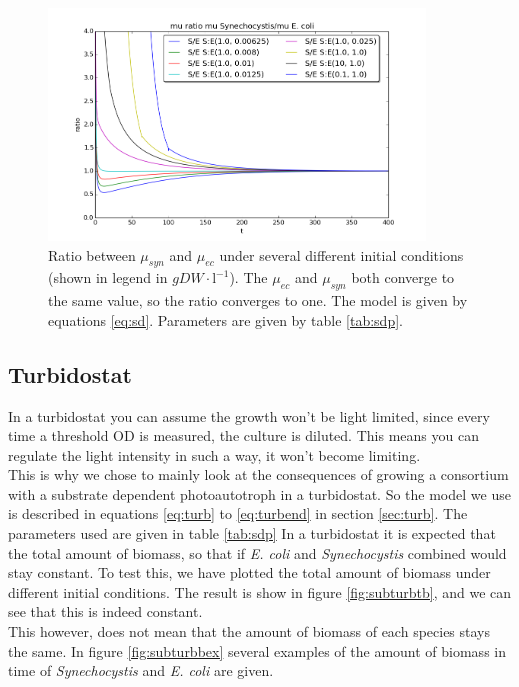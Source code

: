 \documentclass[10pt]{report}
\begin{document}
\begin{figure}[!ht]
 \begin{center}  
     \includegraphics[width=10cm]{ratios_interdependent_muratio.png}
     \caption{Ratio between $\mu_{syn}$ and $\mu_{ec}$ under several different initial conditions (shown in legend in $gDW\cdot \text{l}^{-1}$). The $\mu_{ec}$ and $\mu_{syn}$ both converge to the same value, so the ratio converges to one. The model is given by equations \ref{eq:sd}. Parameters are given by table \ref{tab:sdp}.}
    \label{fig:submurat}
    \end{center}
\end{figure}

\pagebreak
\newpage

\subsection{Turbidostat}
In a turbidostat you can assume the growth won't be light limited, since every time a threshold OD is measured, the culture is diluted. This means you can regulate the light intensity in such a way, it won't become limiting.\\
This is why we chose to mainly look at the consequences of growing a consortium with a substrate dependent photoautotroph in a turbidostat. So the model we use is described in equations \ref{eq:turb} to \ref{eq:turbend} in section \ref{sec:turb}. The parameters used are given in table \ref{tab:sdp}
In a turbidostat it is expected that the total amount of biomass, so that if \textit{E. coli} and \textit{Synechocystis} combined would stay constant. To test this, we have plotted the total amount of biomass under different initial conditions. The result is show in figure \ref{fig:subturbtb}, and we can see that this is indeed constant. \\
This however, does not mean that the amount of biomass of each species stays the same. In figure \ref{fig:subturbbex} several examples of the amount of biomass in time of \textit{Synechocystis} and \textit{E. coli} are given.
\end{document}
